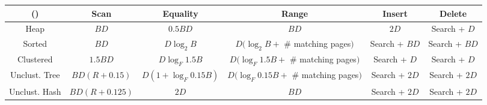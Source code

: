 \documentclass[landscape,8pt]{extarticle}
\begin{document}
\begin{multicols}{4}
\begin{itemize}
\begin{itemize}
              \end{itemize}
    \end{itemize}
    \begin{center}
        \begin{adjustbox}{angle=270}
            \begin{tabular}{ | c | c | c | c | c | c | } \hline
                ()            & Scan          & Equality              & Range                                    & Insert        & Delete        \\ \hline
                Heap          & $BD$          & $0.5 BD$              & $BD$                                     & $2D$          & Search + $D$  \\ \hline
                Sorted        & $BD$          & $D \log_2 B$          & $D(\log_2 B +$ \# matching pages$)$      & Search + $BD$ & Search + $BD$ \\ \hline
                Clustered     & $1.5 BD$      & $D \log_F 1.5 B$      & $D(\log_F 1.5B + $ \# matching pages$)$  & Search + $D$  & Search + $D$  \\ \hline
                Unclust. Tree & $BD(R+0.15)$  & $D(1 + \log_F 0.15B)$ & $D(\log_F 0.15B + $ \# matching pages$)$ & Search + $2D$ & Search + $2D$ \\ \hline
                Unclust. Hash & $BD(R+0.125)$ & $2D$                  & $BD$                                     & Search + $2D$ & Search + $2D$ \\ \hline
            \end{tabular}
        \end{adjustbox}
    \end{center}
\end{multicols}
\end{document}
